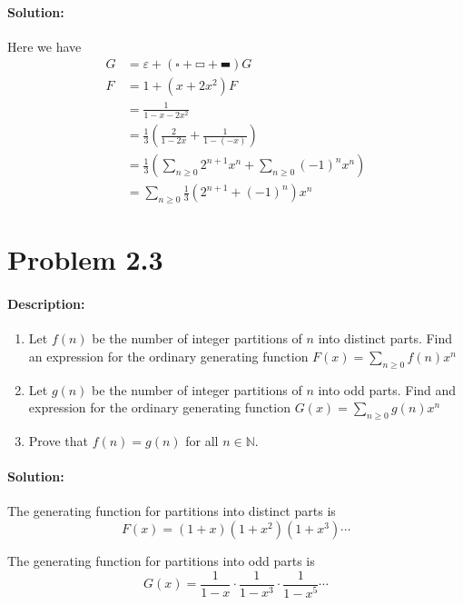 \documentclass[a4paper,notitlepage]{article}
\makeatletter
\theoremstyle{plain}
\theoremstyle{definition}
\newcommand{\wre}{\hrectangle}
\newcommand{\bre}{\hrectangleblack}
\newcommand{\wsq}{\smwhtsquare}
\newcommand{\leqnomode}{\tagsleft@true}
\makeatother
\begin{document}
\paragraph{Solution:}
Here we have
\leqnomode
\begin{align*}
    G &= \varepsilon + (\wsq + \wre + \bre)G \\
    \tag*{so} F &= 1 + (x+2x^2)F \\
    &=  \frac{1}{1-x-2x^2} \\
    &= \frac{1}{3}\left( \frac{2}{1-2x} + \frac{1}{1-(-x)} \right) \\
    &= \frac{1}{3} \left( \sum_{n\geq 0}2^{n+1}x^n + \sum_{n\geq 0}(-1)^n x^n \right) \\
    &= \sum_{n\geq 0}\frac{1}{3} (2^{n+1}+(-1)^n)x^n
\end{align*}

\section*{Problem 2.3}
\paragraph{Description:}
\begin{enumerate}
    \item Let $f(n)$ be the number of integer partitions of $n$ into distinct parts. Find an expression for the ordinary generating function $\displaystyle F(x) = \sum_{n\geq 0} f(n)x^n$
    \item Let $g(n)$ be the number of integer partitions of $n$ into odd parts. Find and expression for the ordinary generating function $\displaystyle G(x) = \sum_{n\geq 0} g(n)x^n$
    \item Prove that $f(n) = g(n)$ for all $n\in \mathbb{N}$.
\end{enumerate}

\paragraph{Solution:}
The generating function for partitions into distinct parts is
\begin{equation*}
    F(x) = (1+x)(1+x^2)(1+x^3)\cdots
\end{equation*}

The generating function for partitions into odd parts is
\begin{equation*}
    G(x) = \frac{1}{1-x}\cdot \frac{1}{1-x^3} \cdot \frac{1}{1-x^5}\cdots
\end{equation*}
\end{document}
